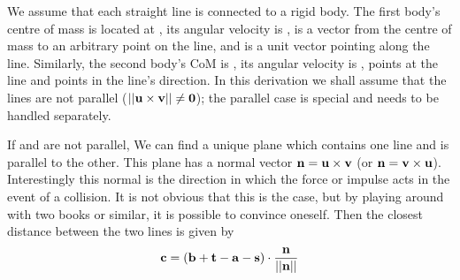 We assume that each straight line is connected to a rigid body. The first body's centre of mass
is located at , its angular velocity is \ve{\omega},  is a vector from the centre
of mass to an arbitrary point on the line, and  is a unit vector pointing along the line.
Similarly, the second body's CoM is , its angular velocity is \ve{\phi},  points at
the line and  points in the line's direction. In this derivation we shall assume that the
lines are not parallel ($\norm{\ve{u}\times\ve{v}} \ne \ve{0}$); the parallel case is special
and needs to be handled separately.

If  and  are not parallel, We can find a unique plane which contains one line and is
parallel to the other. This plane has a normal vector $\ve{n} = \ve{u}\times\ve{v}$ (or
$\ve{n} = \ve{v}\times\ve{u}$). Interestingly this normal is the direction in which the force or
impulse acts in the event of a collision. It is not obvious that this is the case, but by playing
around with two books or similar, it is possible to convince oneself. Then the closest distance
between the two lines is given by
\begin{equation}
\ve{c} = (\ve{b} + \ve{t} - \ve{a} - \ve{s})\cdot\frac{\ve{n}}{\norm{\ve{n}}}
\end{equation}

